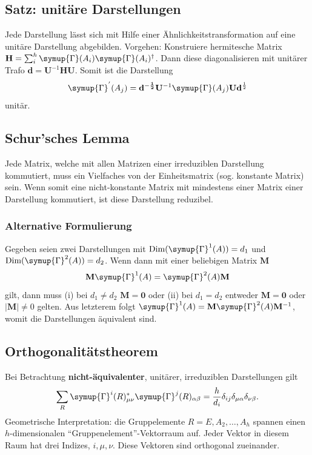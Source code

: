 \documentclass[
  captions=tableheading,  %
  titlepage=firstiscover, %
]{scrartcl}
\begin{document}
\subsection{Satz: unitäre Darstellungen}
Jede Darstellung lässt sich mit Hilfe einer Ähnlichkeitstransformation auf eine 
unitäre Darstellung abgebilden. 
Vorgehen: Konstruiere hermitesche Matrix 
${\mathbf{H} = \sum_i^h \symup{\Gamma}(A_i) \symup{\Gamma} (A_i)^\dagger}$. 
Dann diese diagonalisieren mit unitärer Trafo 
$\mathbf{d} = \mathbf{U}^{-1} \mathbf{H} \mathbf{U}$. 
Somit ist die Darstellung 
\begin{equation*}
  \symup{\Gamma}^{'}(A_j) = \mathbf{d^{-\frac{1}{2}}} \mathbf{U}^{-1} \symup{\Gamma}(A_j) \mathbf{U} \mathbf{d}^{\frac{1}{2}}
\end{equation*}
unitär.
\subsection{Schur'sches Lemma}
Jede Matrix, welche mit allen Matrizen einer irreduziblen Darstellung kommutiert,
muss ein Vielfaches von der Einheitsmatrix (sog. konstante Matrix) sein. 
Wenn somit eine nicht-konstante Matrix mit mindestens einer Matrix einer Darstellung kommutiert, 
ist diese Darstellung reduzibel.
\subsubsection{Alternative Formulierung}
Gegeben seien zwei Darstellungen mit $\text{Dim}(\symup{\Gamma}^1(A)) = d_1$ und $\text{Dim}(\symup{\Gamma}^2(A)) = d_2$.
Wenn dann mit einer beliebigen Matrix $\mathbf{M}$
\begin{equation*}
  \mathbf{M}\symup{\Gamma}^1(A) = \symup{\Gamma}^2(A) \mathbf{M}
\end{equation*}
gilt, dann muss (i) bei $d_1 \neq d_2$ $\mathbf{M} = \mathbf{0}$ oder (ii) bei $d_1 = d_2$ entweder 
$\mathbf{M} = \mathbf{0}$ oder $|\mathbf{M}| \neq 0$ gelten.
Aus letzterem folgt $\symup{\Gamma}^1(A) = \mathbf{M} \symup{\Gamma}^2(A) \mathbf{M}^{-1} $, womit 
die Darstellungen äquivalent sind.
\subsection{Orthogonalitätstheorem}
\label{sub:orth}
Bei Betrachtung \textbf{nicht-äquivalenter}, unitärer, irreduziblen Darstellungen gilt
\begin{equation*}
  \sum_R \symup{\Gamma}^i(R)^*_{\mu \nu}\symup{\Gamma}^j(R)_{\alpha \beta} = \frac{h}{d_i} \delta_{ij}\delta_{\mu \alpha}\delta_{\nu \beta}.
\end{equation*}
Geometrische Interpretation: die Gruppelemente $R = E, A_2, \ldots, A_h$ spannen einen 
$h$-dimensionalen \enquote{Gruppenelement}-Vektorraum auf.
Jeder Vektor in diesem Raum hat drei Indizes, $i, \mu, \nu$.
Diese Vektoren sind orthogonal zueinander.
\end{document}
